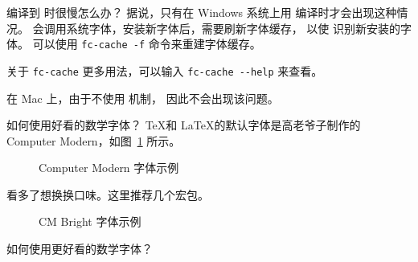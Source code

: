 \begin{myQA}{编译到  时很慢怎么办？}
	据说，只有在 Windows 系统上用  编译时才会出现这种情况。
	 会调用系统字体，安装新字体后，需要刷新字体缓存，
	以使  识别新安装的字体。
	可以使用 \verb|fc-cache -f| 命令来重建字体缓存。
	
	关于 \verb|fc-cache| 更多用法，可以输入 \verb|fc-cache --help| 来查看。
	
	在 Mac 上，由于不使用  机制，
	因此不会出现该问题。
	
\end{myQA}

\begin{myQA}{如何使用好看的数学字体？}
	\TeX 和 \LaTeX 的默认字体是高老爷子制作的 Computer Modern，如图~\ref{Fig:cm_1} 所示。
	
	\begin{figure}[h]
		\centering
		\caption{Computer Modern 字体示例}
		\label{Fig:cm_1}
	\end{figure}
	
	看多了想换换口味。这里推荐几个宏包。
	
	\begin{figure}[h]
		\centering
		\caption{CM Bright 字体示例}
		\label{Fig:cmbright}
	\end{figure}
\end{myQA}

\begin{myQA}{如何使用更好看的数学字体？}
\end{myQA}
